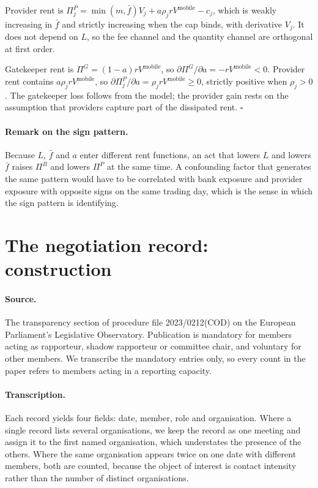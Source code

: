 \documentclass[11pt]{article}
\theoremstyle{plain}\newtheorem{proposition}{Proposition}
\begin{document}
Provider rent is $\Pi^P_j = \min(m,\bar f)V_j + a\rho_j rV^{\mathrm{mobile}} - c_j$, which is weakly increasing in $\bar f$ and strictly increasing when the cap binds, with derivative $V_j$. It does not depend on $L$, so the fee channel and the quantity channel are orthogonal at first order.

Gatekeeper rent is $\Pi^G=(1-a)rV^{\mathrm{mobile}}$, so $\partial\Pi^G/\partial a = -rV^{\mathrm{mobile}}<0$. Provider rent contains $a\rho_j rV^{\mathrm{mobile}}$, so $\partial\Pi^P_j/\partial a=\rho_j rV^{\mathrm{mobile}}\ge 0$, strictly positive when $\rho_j>0$. The gatekeeper loss follows from the model; the provider gain rests on the assumption that providers capture part of the dissipated rent. \hfill$\square$

\paragraph{Remark on the sign pattern.}
Because $L$, $\bar f$ and $a$ enter different rent functions, an act that lowers $L$ and lowers $\bar f$ raises $\Pi^B$ and lowers $\Pi^P$ at the same time. A confounding factor that generates the same pattern would have to be correlated with bank exposure and provider exposure with opposite signs on the same trading day, which is the sense in which the sign pattern is identifying.

\section{The negotiation record: construction}\label{app:lobby}

\paragraph{Source.} The transparency section of procedure file 2023/0212(COD) on the European Parliament's Legislative Observatory. Publication is mandatory for members acting as rapporteur, shadow rapporteur or committee chair, and voluntary for other members. We transcribe the mandatory entries only, so every count in the paper refers to members acting in a reporting capacity.

\paragraph{Transcription.} Each record yields four fields: date, member, role and organisation. Where a single record lists several organisations, we keep the record as one meeting and assign it to the first named organisation, which understates the presence of the others. Where the same organisation appears twice on one date with different members, both are counted, because the object of interest is contact intensity rather than the number of distinct organisations.
\end{document}
